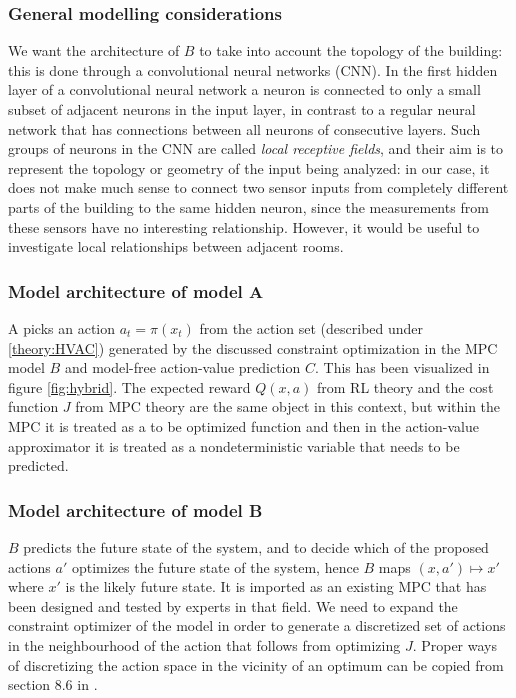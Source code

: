 \documentclass{article}
\theoremstyle{definition}
\theoremstyle{remark}
\begin{document}
\subsubsection{General modelling considerations}
We want the architecture of $B$ to take into account the topology of the building: this is done through a convolutional neural networks (CNN). In the first hidden layer of a convolutional neural network a neuron is connected to only a small subset of adjacent neurons in the input layer, in contrast to a regular neural network that has connections between all neurons of consecutive layers. Such groups of neurons in the CNN are called \textit{local receptive fields}, and their aim is to represent the topology or geometry of the input being analyzed: in our case, it does not make much sense to connect two sensor inputs from completely different parts of the building to the same hidden neuron, since the measurements from these sensors have no interesting relationship. However, it would be useful to investigate local relationships between adjacent rooms. 


\subsubsection{Model architecture of model A} \label{Method:modelA}
A picks an action $a_t = \pi(x_t)$ from the action set (described under \ref{theory:HVAC}) generated by the discussed constraint optimization in the MPC model $B$  and model-free action-value prediction $C$. This has been visualized in figure \ref{fig:hybrid}. The expected reward $Q(x,a)$ from RL theory and the cost function $J$ from MPC theory are the same object in this context, but within the MPC it is treated as a to be optimized function and then in the action-value approximator it is treated as a nondeterministic variable that needs to be predicted. 

\subsubsection{Model architecture of model B}\label{Method:modelling:B}
$B$ predicts the future state of the system, and to decide which of the proposed actions $a'$ optimizes the future state of the system, hence $B$ maps $(x,a') \mapsto x'$ where $x'$ is the likely future state. It is imported as an existing MPC that has been designed and tested by experts in that field. We need to expand the constraint optimizer of the model in order to generate a discretized set of actions in the neighbourhood of the action that follows from optimizing $J$. Proper ways of discretizing the action space in the vicinity of an optimum can be copied from section 8.6 in \cite{luo2022controlling}.
\end{document}
